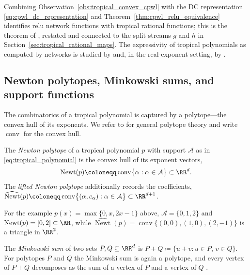 Combining Observation~\ref{obs:tropical_convex_cpwl} with the DC representation \eqref{eq:cpwl_dc_representation} and Theorem~\ref{thm:cpwl_relu_equivalence} identifies \ac{relu} network functions with tropical rational functions; this is the theorem of \textcite{Zhang2018}, restated and connected to the split streams $g$ and $h$ in Section~\ref{sec:tropical_rational_maps}. The expressivity of tropical polynomials as computed by networks is studied by \textcite{Misiakos2022neural} and, in the real-exponent setting, by \textcite{Brandenburg2024b}.

\subsection*{Newton polytopes, Minkowski sums, and support functions}

The combinatorics of a tropical polynomial is captured by a polytope---the convex hull of its exponents. We refer to \textcite{Ziegler1995} for general polytope theory and write $\operatorname{conv}$ for the convex hull.

\begin{definition}\label{def:newton_polytope}
The \emph{Newton polytope} of a tropical polynomial $p$ with support $\mathcal{A}$ as in \eqref{eq:tropical_polynomial} is the convex hull of its exponent vectors,
\begin{equation}
	\operatorname{Newt}(p) \coloneqq \operatorname{conv}\bigl\{ \alpha : \alpha \in \mathcal{A} \bigr\} \subset \RR^{d}.
	\label{eq:newton_polytope}
\end{equation}
The \emph{lifted Newton polytope} additionally records the coefficients,
$\widehat{\operatorname{Newt}}(p) \coloneqq \operatorname{conv}\bigl\{ (\alpha, c_{\alpha}) : \alpha \in \mathcal{A} \bigr\} \subset \RR^{d+1}$.
\end{definition}

For the example $p(x) = \max\{0, x, 2x-1\}$ above, $\mathcal{A} = \{0, 1, 2\}$ and $\operatorname{Newt}(p) = [0, 2] \subset \RR$, while $\widehat{\operatorname{Newt}}(p) = \operatorname{conv}\{(0,0), (1,0), (2,-1)\}$ is a triangle in $\RR^2$.

\begin{definition}\label{def:minkowski_sum}
The \emph{Minkowski sum} of two sets $P, Q \subseteq \RR^{d}$ is $P + Q \coloneqq \{ u + v : u \in P,\, v \in Q \}$. For polytopes $P$ and $Q$ the Minkowski sum is again a polytope, and every vertex of $P + Q$ decomposes as the sum of a vertex of $P$ and a vertex of $Q$ \cite{Ziegler1995}.
\end{definition}

